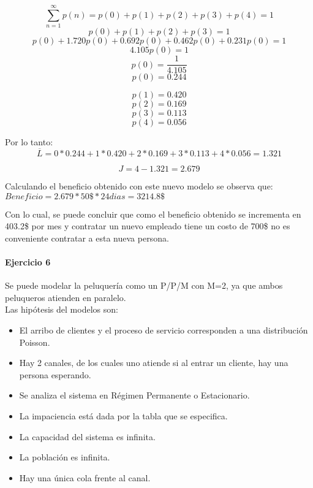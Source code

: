 \documentclass{article}
\begin{document}
    $$ \sum _{n=1}^{\infty} {p(n)} = p(0) + p(1) + p(2) + p(3) + p(4) = 1$$
    $$p(0) + p(1) + p(2) + p(3) = 1$$
    $$p(0) + 1.720 p(0) + 0.692 p(0) + 0.462 p(0) + 0.231 p(0) = 1$$
    $$4.105 p(0) = 1$$
    $$p(0) = \frac{1}{4.105}$$
    $$p(0) = 0.244$$

  $$p(1) = 0.420$$
  $$p(2) = 0.169$$
  $$p(3) = 0.113$$
  $$p(4) = 0.056$$

Por lo tanto:
$$\overline{L} = 0 * 0.244 + 1 * 0.420 + 2 * 0.169 + 3 * 0.113 + 4 * 0.056 = 1.321 $$

$$J = 4 - 1.321 = 2.679 $$
  
Calculando el beneficio obtenido con este nuevo modelo se observa que:
$Beneficio = 2.679 * 50\$ * 24 dias =  3214.8\$ $

Con lo cual, se puede concluir que como el beneficio obtenido se incrementa en 403.2\$ por mes y contratar un nuevo empleado tiene un costo de 700\$ no es conveniente contratar a esta nueva persona.



\paragraph{Ejercicio 6}
    Se puede modelar la peluquería como un P/P/M con M=2, ya que ambos peluqueros atienden en paralelo. \\
    Las hipótesis del modelos son:
    \begin{itemize}
     \item El arribo de clientes y el proceso de servicio corresponden a una distribución Poisson.
     \item Hay 2 canales, de los cuales uno atiende si al entrar un cliente, hay una persona esperando.
     \item Se analiza el sistema en Régimen Permanente o Estacionario.
     \item La impaciencia está dada por la tabla que se especifica.
     \item La capacidad del sistema es infinita.
     \item La población es infinita.
     \item Hay una única cola frente al canal.
    \end{itemize}
\end{document}

